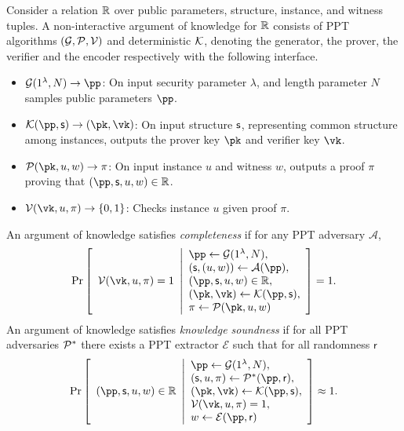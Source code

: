 \begin{definition}\label{def:nark}
    Consider a relation $\mathbb{R}$ over 
    public parameters, structure, instance, and witness tuples.
    A non-interactive argument of knowledge for $\mathbb{R}$ consists of PPT algorithms
    $(\mathcal{G}, \mathcal{P},\mathcal{V})$ 
    and deterministic $\mathcal{K}$,
    denoting the generator, 
    the prover,    
    the verifier
    and the encoder respectively with the following interface.
    \begin{itemize}
        \item $\Gn(1^{\lambda}, N) \to \pp$: 
        On input security parameter $\lambda$,
        and length parameter $N$
        samples public parameters $\pp$.
        \item $\En(\pp, \Str) \to (\pk, \vk)$: 
        On input structure $\mathsf{s}$, 
        representing common structure among instances,
        outputs the prover key $\pk$ and verifier key $\vk$.
        \item $\Po(\pk, u, w) \to \pi$: On input instance $u$ and
          witness $w$, outputs a proof $\pi$ proving that $(\pp, \Str, u, w) \in \R$.
        \item $\V(\vk, u, \pi) \to \{0, 1\}$: 
        Checks instance $u$ 
        given proof $\pi$.
    \end{itemize}
    An argument of knowledge satisfies \textit{completeness} if for any PPT adversary $\mathcal{A}$,
    \begin{align*}
    \Pr
    \left[
        \begin{array}{l}
        \V(\vk, u, \pi) = 1
        \end{array}
        \middle\vert
        \begin{array}{l}
        \pp \gets \Gn(1^{\lambda}, N),\\
        (\Str,(u, w)) \gets \mathcal{A}(\pp),\\
        (\pp, \Str, u, w) \in \R,\\
        (\pk, \vk) \gets \En(\pp, \Str),\\
        \pi \gets \Po(\pk, u, w)
        \end{array}
        \right]
    = 1.
    \end{align*}
    An argument of knowledge satisfies \textit{knowledge soundness} if for all PPT adversaries $\mathcal{P}^*$ there exists a PPT extractor $\mathcal{E}$ such that for all randomness $\mathsf{r}$
    \[
    \Pr
    \left[
        \begin{array}{l}
        (\pp, \Str, u, w) \in \R
        \end{array}
        \middle\vert
        \begin{array}{l}
        \pp \gets \Gn(1^{\lambda}, N),\\
        (\Str,u,\pi) \gets \Po^*(\pp, \mathsf{r}),\\
        (\pk, \vk) \gets \En(\pp, \Str),\\
        \V(\vk, u, \pi) = 1,\\
        w \gets \mathcal{E}(\pp, \mathsf{r})
        \end{array}
        \right]
    \approx 1.
    \]
\end{definition}
